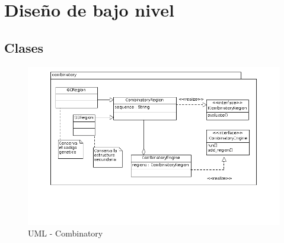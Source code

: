 \section{Dise\~no de bajo nivel}
  \subsection{Clases}
  \begin{figure}
    \centering
    \includegraphics[scale=0.5]{lld-combinatory.png}  
    \caption{UML - Combinatory}
    \label{uml:2}
  \end{figure}